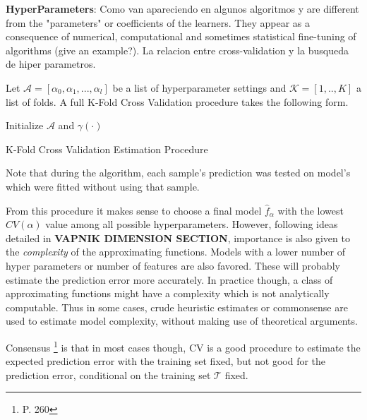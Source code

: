  
 \textbf{HyperParameters}:
 Como van apareciendo en algunos algoritmos y are different from the "parameters" or coefficients of the learners. They appear as a consequence of numerical, computational and sometimes statistical fine-tuning of algorithms (give an example?). 
 La relacion entre cross-validation y la busqueda de hiper parametros. 
 
 \textit{}
 
 \textit{} 
 
 Let $\mathcal{A} = [\alpha_0, \alpha_1,..., \alpha_l   ]$ be a list of hyperparameter settings and  $\mathcal{K} =[1,..,K]$ a list of folds.  A full K-Fold Cross Validation procedure takes the following form.
 
 \begin{algorithm}%
 	\SetAlgoLined
 	Initialize $\mathcal{A}$ and $\gamma(\cdot)$\;
 \caption{K-Fold Cross Validation Estimation Procedure}
\end{algorithm}

Note that during the algorithm, each sample's prediction was tested on model's which were fitted without using that sample. 

From this procedure it makes sense to choose a final  model $\hat{f}_\alpha$ with the lowest $CV(\alpha)$ value among all possible hyperparameters. However, following ideas detailed in \textbf{VAPNIK DIMENSION SECTION}, importance is also given to the \textit{complexity} of the approximating functions. Models with a lower number of hyper parameters or number of features are also favored. These will probably estimate the prediction error more accurately. In practice though, a class of approximating functions might have a complexity which is not analytically computable. Thus in some cases, crude heuristic estimates or commonsense are used to estimate model complexity, without making use of theoretical arguments.


Consensus \footnote{\cite{hastie-elemstatslearn} P. 260} is that in most cases though, CV is a good procedure to estimate the expected prediction error with the training set fixed, but not good for the prediction error, conditional on the training set $\mathcal{T}$ fixed.


